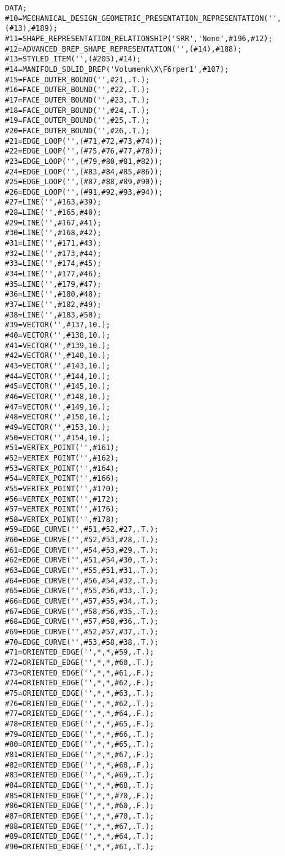 \begin{lstlisting}[captionpos=b, style=customc, caption=Beschreibung eines Quaders in STEP, label=lis:simplestp]
DATA;
#10=MECHANICAL_DESIGN_GEOMETRIC_PRESENTATION_REPRESENTATION('',(#13),#189);
#11=SHAPE_REPRESENTATION_RELATIONSHIP('SRR','None',#196,#12);
#12=ADVANCED_BREP_SHAPE_REPRESENTATION('',(#14),#188);
#13=STYLED_ITEM('',(#205),#14);
#14=MANIFOLD_SOLID_BREP('Volumenk\X\F6rper1',#107);
#15=FACE_OUTER_BOUND('',#21,.T.);
#16=FACE_OUTER_BOUND('',#22,.T.);
#17=FACE_OUTER_BOUND('',#23,.T.);
#18=FACE_OUTER_BOUND('',#24,.T.);
#19=FACE_OUTER_BOUND('',#25,.T.);
#20=FACE_OUTER_BOUND('',#26,.T.);
#21=EDGE_LOOP('',(#71,#72,#73,#74));
#22=EDGE_LOOP('',(#75,#76,#77,#78));
#23=EDGE_LOOP('',(#79,#80,#81,#82));
#24=EDGE_LOOP('',(#83,#84,#85,#86));
#25=EDGE_LOOP('',(#87,#88,#89,#90));
#26=EDGE_LOOP('',(#91,#92,#93,#94));
#27=LINE('',#163,#39);
#28=LINE('',#165,#40);
#29=LINE('',#167,#41);
#30=LINE('',#168,#42);
#31=LINE('',#171,#43);
#32=LINE('',#173,#44);
#33=LINE('',#174,#45);
#34=LINE('',#177,#46);
#35=LINE('',#179,#47);
#36=LINE('',#180,#48);
#37=LINE('',#182,#49);
#38=LINE('',#183,#50);
#39=VECTOR('',#137,10.);
#40=VECTOR('',#138,10.);
#41=VECTOR('',#139,10.);
#42=VECTOR('',#140,10.);
#43=VECTOR('',#143,10.);
#44=VECTOR('',#144,10.);
#45=VECTOR('',#145,10.);
#46=VECTOR('',#148,10.);
#47=VECTOR('',#149,10.);
#48=VECTOR('',#150,10.);
#49=VECTOR('',#153,10.);
#50=VECTOR('',#154,10.);
#51=VERTEX_POINT('',#161);
#52=VERTEX_POINT('',#162);
#53=VERTEX_POINT('',#164);
#54=VERTEX_POINT('',#166);
#55=VERTEX_POINT('',#170);
#56=VERTEX_POINT('',#172);
#57=VERTEX_POINT('',#176);
#58=VERTEX_POINT('',#178);
#59=EDGE_CURVE('',#51,#52,#27,.T.);
#60=EDGE_CURVE('',#52,#53,#28,.T.);
#61=EDGE_CURVE('',#54,#53,#29,.T.);
#62=EDGE_CURVE('',#51,#54,#30,.T.);
#63=EDGE_CURVE('',#55,#51,#31,.T.);
#64=EDGE_CURVE('',#56,#54,#32,.T.);
#65=EDGE_CURVE('',#55,#56,#33,.T.);
#66=EDGE_CURVE('',#57,#55,#34,.T.);
#67=EDGE_CURVE('',#58,#56,#35,.T.);
#68=EDGE_CURVE('',#57,#58,#36,.T.);
#69=EDGE_CURVE('',#52,#57,#37,.T.);
#70=EDGE_CURVE('',#53,#58,#38,.T.);
#71=ORIENTED_EDGE('',*,*,#59,.T.);
#72=ORIENTED_EDGE('',*,*,#60,.T.);
#73=ORIENTED_EDGE('',*,*,#61,.F.);
#74=ORIENTED_EDGE('',*,*,#62,.F.);
#75=ORIENTED_EDGE('',*,*,#63,.T.);
#76=ORIENTED_EDGE('',*,*,#62,.T.);
#77=ORIENTED_EDGE('',*,*,#64,.F.);
#78=ORIENTED_EDGE('',*,*,#65,.F.);
#79=ORIENTED_EDGE('',*,*,#66,.T.);
#80=ORIENTED_EDGE('',*,*,#65,.T.);
#81=ORIENTED_EDGE('',*,*,#67,.F.);
#82=ORIENTED_EDGE('',*,*,#68,.F.);
#83=ORIENTED_EDGE('',*,*,#69,.T.);
#84=ORIENTED_EDGE('',*,*,#68,.T.);
#85=ORIENTED_EDGE('',*,*,#70,.F.);
#86=ORIENTED_EDGE('',*,*,#60,.F.);
#87=ORIENTED_EDGE('',*,*,#70,.T.);
#88=ORIENTED_EDGE('',*,*,#67,.T.);
#89=ORIENTED_EDGE('',*,*,#64,.T.);
#90=ORIENTED_EDGE('',*,*,#61,.T.);

\end{lstlisting}
